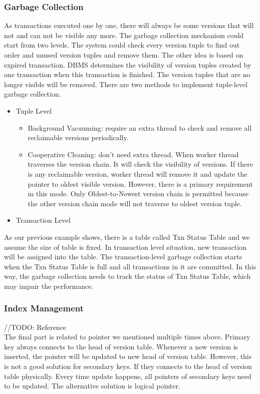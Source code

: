 \subsubsection{Garbage Collection}
As transactions executed one by one, there will always be some versions that will not and can not be visible any more. The garbage collection mechanism could start from two levels. The system could check every version tuple to find out order and unused version tuples and remove them. The other idea is based on expired transaction. DBMS determines the visibility of version tuples created by one transaction when this transaction is finished. The version tuples that are no longer visible will be removed. There are two methods to implement tuple-level garbage collection. 
\begin{itemize}
	\item Tuple Level
		\begin{itemize}
			\item Background Vacuuming: require an extra thread to check and remove all reclaimable versions periodically. 
			
			\item Cooperative Cleaning: don't need extra thread. When worker thread traverses the version chain. It will check the visibility of versions. If there is any reclaimable version, worker thread will remove it and update the pointer to oldest visible version. However, there is a primary requirement in this mode. Only Oldest-to-Newest version chain is permitted because the other version chain mode will not traverse to oldest version tuple.  
		\end{itemize}
	\item Transaction Level
\end{itemize}
As our previous example shows, there is a table called Txn Status Table and we assume the size of table is fixed. In transaction level situation, new transaction will be assigned into the table. The transaction-level garbage collection starts when the Txn Status Table is full and all transactions in it are committed. In this way, the garbage collection needs to track the status of Txn Status Table, which may impair the performance.    
\subsubsection{Index Management}
//TODO: Reference\\
The final part is related to pointer we mentioned multiple times above. Primary key always connects to the head of version table. Whenever a new version is inserted, the pointer will be updated to new head of version table. However, this is not a good solution for secondary keys. If they connects to the head of version table physically. Every time update happens, all pointers of secondary keys need to be updated. The alternative solution is logical pointer. 

